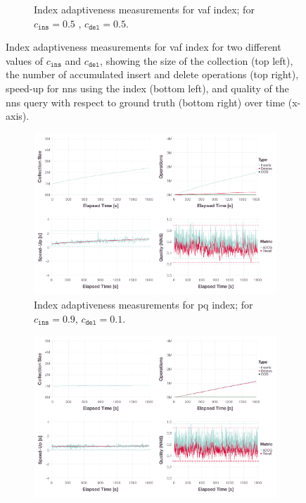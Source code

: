 \begin{figure}[p]
\begin{subfigure}[b]{\textwidth}
        \caption{Index adaptiveness measurements for \acrshort{vaf} index; for $c_{\texttt{ins}} = 0.5$ , $c_{\texttt{del}} = 0.5$.}
        \label{figure:index_adaptiveness_vaf_50_50}
    \end{subfigure}
    \caption{Index adaptiveness measurements for \acrshort{vaf} index for two different values of $c_{\texttt{ins}}$ and $c_{\texttt{del}}$, showing the size of the collection (top left), the number of accumulated insert and delete operations (top right), speed-up for \acrshort{nns} using the index (bottom left), and quality of the \acrshort{nns} query with respect to ground truth (bottom right) over time (x-axis).}
    \label{figure:index_adaptiveness_vaf}
\end{figure}

\begin{figure}[p]
    \centering
    \begin{subfigure}[b]{\textwidth}
        \centering
        \includegraphics[width=\textwidth]{figures/index/index-pq-adaptiveness-90-10-no-rebuild}
        \caption{Index adaptiveness measurements for \acrshort{pq} index; for $c_{\texttt{ins}} = 0.9$, $c_{\texttt{del}} = 0.1$.}
        \label{figure:index_adaptiveness_pq_90_10}
    \end{subfigure}
    \hfill
    \centering
    \begin{subfigure}[b]{\textwidth}
        \centering
        \includegraphics[width=\textwidth]{figures/index/index-pq-adaptiveness-50-50-no-rebuild}

\end{subfigure}
\end{figure}
